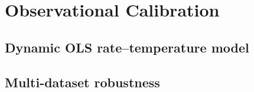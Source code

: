 \documentclass[11pt]{article}
\begin{document}
% 
%
%
%
%


\section{Observational Calibration}

\subsection{Dynamic OLS rate--temperature model}
% 
%
%

\subsection{Multi-dataset robustness}
%
%
%
%
\end{document}
